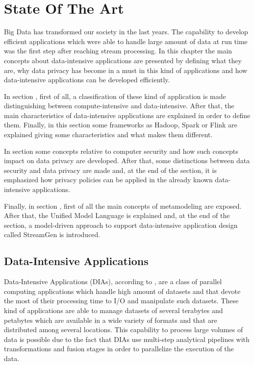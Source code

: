 \chapter[State Of The Art]{State Of The Art}
\label{sec:chapter2}

Big Data has transformed our society in the last years. The capability to develop efficient applications which were able to handle large amount of data at run time was the first step after reaching stream processing. In this chapter the main concepts about data-intensive applications are presented by defining what they are, why data privacy has become in a must in this kind of applications and how data-intensive applications can be developed efficiently.

In section , first of all, a classification of these kind of application is made distinguishing between compute-intensive and data-intensive. After that, the main characteristics of data-intensive applications are explained in order to define them. Finally, in this section some frameworks as Hadoop, Spark or Flink are explained giving some characteristics and what makes them different.

In section  some concepts relative to computer security and how such concepts impact on data privacy are developed. After that, some distinctions between data security and data privacy are made and, at the end of the section, it is emphasized how privacy policies can be applied in the already known data-intensive applications.

Finally, in section , first of all the main concepts of metamodeling are exposed. After that, the Unified Model Language is explained and, at the end of the section, a model-driven approach to support data-intensive application design called StreamGen is introduced.

\section{Data-Intensive Applications}
\label{Data-Intensive Applications}

Data-Intensive Applications (DIAs), according to \cite{cloudcomputing}, are a class of parallel computing applications which handle high amount of datasets and that devote the most of their processing time to I/O and manipulate such datasets. These kind of applications are able to manage datasets of several terabytes and petabytes which are available in a wide variety of formats and that are distributed among several locations. This capability to process large volumes of data is possible due to the fact that DIAs use multi-step analytical pipelines with transformations and fusion stages in order to parallelize the execution of the data.


